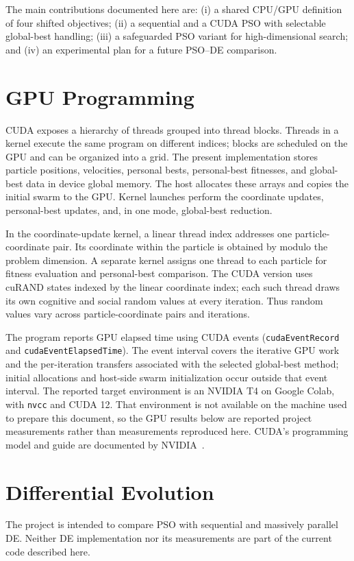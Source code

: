 \documentclass[conference]{IEEEtran}
\begin{document}
The main contributions documented here are: (i) a shared CPU/GPU definition
of four shifted objectives; (ii) a sequential and a CUDA PSO with selectable
global-best handling; (iii) a safeguarded PSO variant for high-dimensional
search; and (iv) an experimental plan for a future PSO--DE comparison.

\section{GPU Programming}
\label{sec:gpu}
CUDA exposes a hierarchy of threads grouped into thread blocks. Threads in a
kernel execute the same program on different indices; blocks are scheduled on
the GPU and can be organized into a grid. The present implementation stores
particle positions, velocities, personal bests, personal-best fitnesses, and
global-best data in device global memory. The host allocates these arrays and
copies the initial swarm to the GPU. Kernel launches perform the coordinate
updates, personal-best updates, and, in one mode, global-best reduction.

In the coordinate-update kernel, a linear thread index addresses one
particle-coordinate pair. Its coordinate within the particle is obtained by
modulo the problem dimension. A separate kernel assigns one thread to each
particle for fitness evaluation and personal-best comparison. The CUDA
version uses cuRAND states indexed by the linear coordinate index; each such
thread draws its own cognitive and social random values at every iteration.
Thus random values vary across particle-coordinate pairs and iterations.

The program reports GPU elapsed time using CUDA events
(\texttt{cudaEventRecord} and \texttt{cudaEventElapsedTime}). The event interval
covers the iterative GPU work and the per-iteration transfers associated with
the selected global-best method; initial allocations and host-side swarm
initialization occur outside that event interval. The reported target
environment is an NVIDIA T4 on Google Colab, with \texttt{nvcc} and CUDA 12.
That environment is not available on the machine used to prepare this
document, so the GPU results below are reported project measurements rather
than measurements reproduced here. CUDA's programming model and guide are
documented by NVIDIA~\cite{nvidiaCudaGuide}.

\section{Differential Evolution}
\label{sec:de}
The project is intended to compare PSO with sequential and massively parallel
DE. Neither DE implementation nor its measurements are part of the current
code described here.
\end{document}
